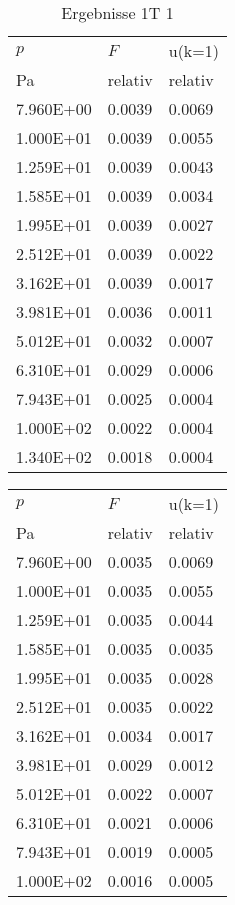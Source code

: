 \begin{table}
\begin{tabular}{l l l }
\toprule
$p$&$F$&u(k=1)\\
 Pa & relativ & relativ\\\midrule
\num{7.960E+00}&\num{0.0039}&\num{0.0069}\\
\num{1.000E+01}&\num{0.0039}&\num{0.0055}\\
\num{1.259E+01}&\num{0.0039}&\num{0.0043}\\
\num{1.585E+01}&\num{0.0039}&\num{0.0034}\\
\num{1.995E+01}&\num{0.0039}&\num{0.0027}\\
\num{2.512E+01}&\num{0.0039}&\num{0.0022}\\
\num{3.162E+01}&\num{0.0039}&\num{0.0017}\\
\num{3.981E+01}&\num{0.0036}&\num{0.0011}\\
\num{5.012E+01}&\num{0.0032}&\num{0.0007}\\
\num{6.310E+01}&\num{0.0029}&\num{0.0006}\\
\num{7.943E+01}&\num{0.0025}&\num{0.0004}\\
\num{1.000E+02}&\num{0.0022}&\num{0.0004}\\
\num{1.340E+02}&\num{0.0018}&\num{0.0004}\\
\bottomrule
\end{tabular}\caption{Ergebnisse 1T 1}\end{table}\begin{table}\begin{tabular}{l l l }
\toprule
$p$&$F$&u(k=1)\\
 Pa & relativ & relativ\\\midrule
\num{7.960E+00}&\num{0.0035}&\num{0.0069}\\
\num{1.000E+01}&\num{0.0035}&\num{0.0055}\\
\num{1.259E+01}&\num{0.0035}&\num{0.0044}\\
\num{1.585E+01}&\num{0.0035}&\num{0.0035}\\
\num{1.995E+01}&\num{0.0035}&\num{0.0028}\\
\num{2.512E+01}&\num{0.0035}&\num{0.0022}\\
\num{3.162E+01}&\num{0.0034}&\num{0.0017}\\
\num{3.981E+01}&\num{0.0029}&\num{0.0012}\\
\num{5.012E+01}&\num{0.0022}&\num{0.0007}\\
\num{6.310E+01}&\num{0.0021}&\num{0.0006}\\
\num{7.943E+01}&\num{0.0019}&\num{0.0005}\\
\num{1.000E+02}&\num{0.0016}&\num{0.0005}\\

\end{tabular}
\end{table}
